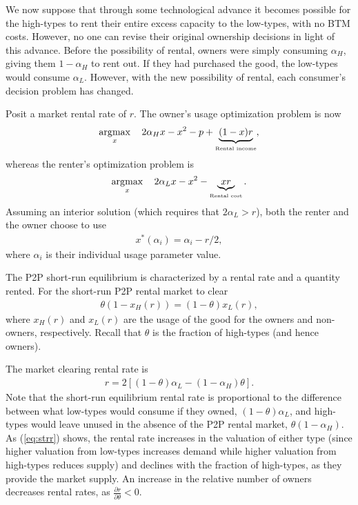 \documentclass[11pt]{article}
\DeclareMathOperator*{\argmax}{\arg\!\max}
\begin{document}
We now suppose that through some technological advance it becomes possible for the high-types to rent their entire excess capacity to the low-types, with no BTM costs.
However, no one can revise their original ownership decisions in light of this advance. 
Before the possibility of rental, owners were simply consuming $\alpha_H$, giving them $1-\alpha_H$ to rent out.
If they had purchased the good, the low-types would consume $\alpha_L$. 
However, with the new possibility of rental, each consumer's decision problem has changed. 

Posit a market rental rate of $r$. 
The owner's usage optimization problem is now 
\begin{align}
\argmax_x \quad 2\alpha_H x - x^2 -p + \underbrace{(1-x)r}_{\mbox{{\tiny Rental income}}},   \nonumber 
\end{align} 
whereas the renter's optimization problem is 
\begin{align}
\argmax_x \quad 2 \alpha_L x - x^2 - \underbrace{xr}_{\mbox{{\tiny Rental cost}}}.  \nonumber
\end{align} 
Assuming an interior solution (which requires that $2\alpha_L > r$), both the renter and the owner choose to use
\begin{align}
x^*(\alpha_i) = \alpha_i - r/2, 
\end{align} 
where $\alpha_i$ is their individual usage parameter value. 

The P2P short-run equilibrium is characterized by a rental rate and a quantity rented. 
For the short-run P2P rental market to clear 
\begin{align}
  \theta \left( 1 - x_H(r) \right) = (1-\theta) x_L(r),
\end{align}
where $x_H(r)$ and $x_L(r)$ are the usage of the good for the owners and non-owners, respectively.
Recall that $\theta$ is the fraction of high-types (and hence owners).

The market clearing rental rate is 
\begin{align} \label{eq:strr} 
r = 2\left[ (1-\theta)\alpha_L - (1-\alpha_H) \theta \right]. 
\end{align}
Note that the short-run equilibrium rental rate is proportional to the difference between what low-types would consume if they owned, $(1-\theta)\alpha_L$, and high-types would leave unused in the absence of the P2P rental market, $\theta (1-\alpha_H)$. 
As (\ref{eq:strr}) shows, the rental rate increases in the valuation of either type (since higher valuation from low-types increases demand while higher valuation from high-types reduces supply) and declines with the fraction of high-types, as they provide the market supply. 
An increase in the relative number of owners decreases rental rates, as $\frac{\partial r}{\partial \theta} < 0$. 
\end{document}

